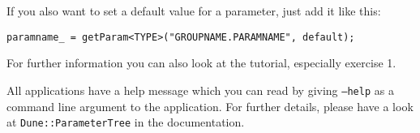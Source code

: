 If you also want to set a default value for a parameter, just add it like this:

\begin{lstlisting}[name=propsyscars,style=DumuxCode]
paramname_ = getParam<TYPE>("GROUPNAME.PARAMNAME", default);
\end{lstlisting}

For further information you can also look at the \Dumux tutorial, especially exercise 1. 

All applications have a help message which you can read by giving
\texttt{--help} as a command line argument to the application.
For further details, please have a look at \texttt{Dune::ParameterTree}
in the \Dune documentation.
